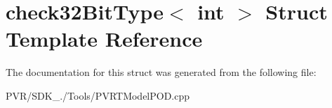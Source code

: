 \hypertarget{structcheck32_bit_type_3_01int_01_4}{\section{check32\+Bit\+Type$<$ int $>$ Struct Template Reference}
\label{structcheck32_bit_type_3_01int_01_4}
}


The documentation for this struct was generated from the following file\+:\begin{DoxyCompactItemize}
\item 
P\+V\+R/\+S\+D\+K\+\_./\+Tools/P\+V\+R\+T\+Model\+P\+O\+D.\+cpp\end{DoxyCompactItemize}
